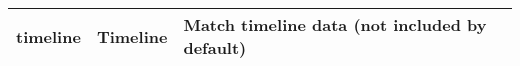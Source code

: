 \begin{table}[!h]
\begin{tabular}{llp{5cm}}
timeline              & Timeline                      & Match timeline data (not included by default)                                                                                                                                                                                                                                                                                                                                                                                                                                                                                                                                                                                           \\ \hline
\end{tabular}
\end{table}

\FloatBarrier
